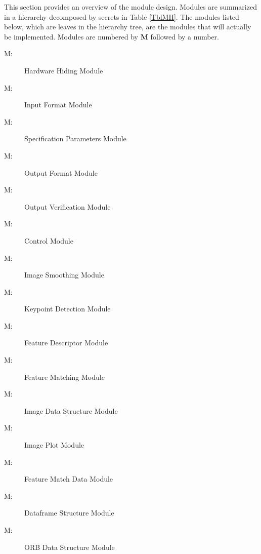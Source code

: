\documentclass[12pt, titlepage]{article}
\newcounter{mnum}
\newcommand{\mthemnum}{M\themnum}
\begin{document}
This section provides an overview of the module design. Modules are summarized
in a hierarchy decomposed by secrets in Table \ref{TblMH}. The modules listed
below, which are leaves in the hierarchy tree, are the modules that will
actually be implemented. Modules are numbered by \textbf{M} followed by a number.
\begin{description}
\item [ \mthemnum \label{mHH}:] Hardware Hiding Module
\item [ \mthemnum \label{mIF}:] Input Format Module
\item [ \mthemnum \label{mSP}:] Specification Parameters Module
\item [ \mthemnum \label{mOF}:] Output Format Module
\item [ \mthemnum \label{mOV}:] Output Verification Module
\item [ \mthemnum \label{mC}:] Control Module
\item [ \mthemnum \label{mIS}:] Image Smoothing Module
\item [ \mthemnum \label{mKD}:] Keypoint Detection Module
\item [ \mthemnum \label{mFD}:] Feature Descriptor Module
\item [ \mthemnum \label{mFM}:] Feature Matching Module
\item [ \mthemnum \label{mIDS}:] Image Data Structure Module
\item [ \mthemnum \label{mIP}:] Image Plot Module
\item [ \mthemnum \label{mFMD}:] Feature Match Data Module
\item [ \mthemnum \label{mDF}:] Dataframe Structure Module
\item [ \mthemnum \label{mORB}:] ORB Data Structure Module
\end{description}
\end{document}
